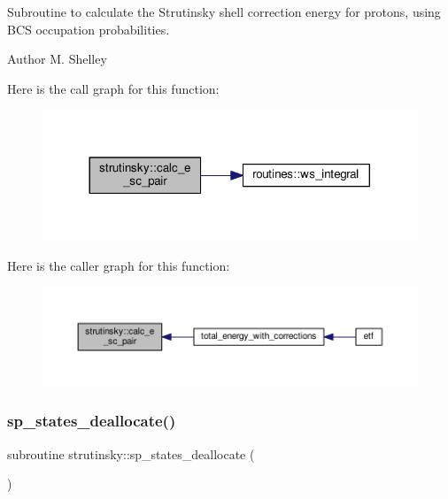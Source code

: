 Subroutine to calculate the Strutinsky shell correction energy for protons, using B\+CS occupation probabilities. 

\begin{DoxyAuthor}{Author}
M. Shelley 
\end{DoxyAuthor}
Here is the call graph for this function\+:
\nopagebreak
\begin{figure}[H]
\begin{center}
\leavevmode
\includegraphics[width=317pt]{namespacestrutinsky_a2cc0d4130d68c345ffe3ffa73706e796_cgraph}
\end{center}
\end{figure}
Here is the caller graph for this function\+:
\nopagebreak
\begin{figure}[H]
\begin{center}
\leavevmode
\includegraphics[width=350pt]{namespacestrutinsky_a2cc0d4130d68c345ffe3ffa73706e796_icgraph}
\end{center}
\end{figure}
\mbox{\label{namespacestrutinsky_a0a07c6adfd14cbf345bf96b70d3f5d82}} 
\subsubsection{\texorpdfstring{sp\+\_\+states\+\_\+deallocate()}{sp\_states\_deallocate()}}
{\footnotesize\ttfamily subroutine strutinsky\+::sp\+\_\+states\+\_\+deallocate (\begin{DoxyParamCaption}{ }\end{DoxyParamCaption})}



